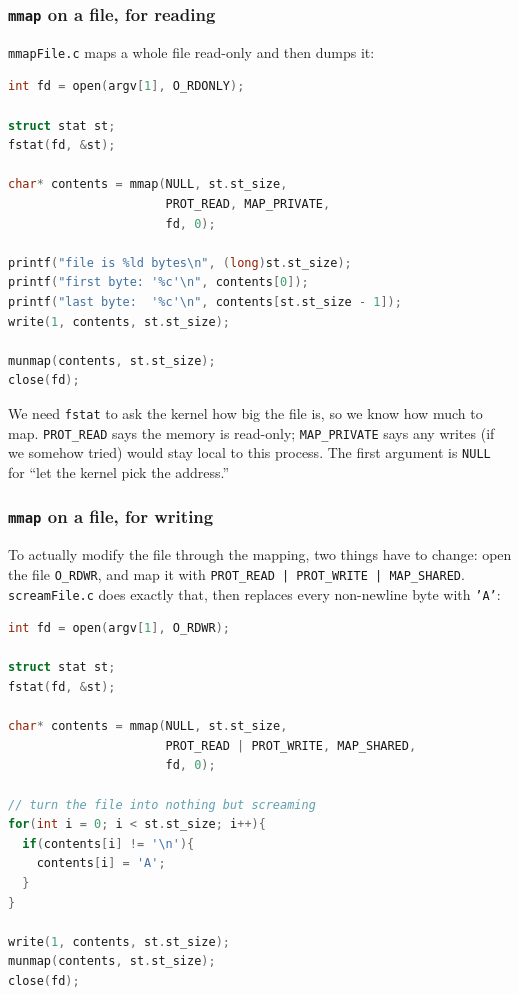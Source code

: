 \documentclass[11pt]{article}
\begin{document}
\subsubsection*{\texttt{mmap} on a file, for reading}

\texttt{mmapFile.c} maps a whole file read-only and then dumps it:

\begin{lstlisting}[language=C]
int fd = open(argv[1], O_RDONLY);

struct stat st;
fstat(fd, &st);

char* contents = mmap(NULL, st.st_size,
                      PROT_READ, MAP_PRIVATE,
                      fd, 0);

printf("file is %ld bytes\n", (long)st.st_size);
printf("first byte: '%c'\n", contents[0]);
printf("last byte:  '%c'\n", contents[st.st_size - 1]);
write(1, contents, st.st_size);

munmap(contents, st.st_size);
close(fd);
\end{lstlisting}

We need \texttt{fstat} to ask the kernel how big the file is, so we
know how much to map. \texttt{PROT\_READ} says the memory is
read-only; \texttt{MAP\_PRIVATE} says any writes (if we somehow
tried) would stay local to this process. The first argument is
\texttt{NULL} for ``let the kernel pick the address.''

\subsubsection*{\texttt{mmap} on a file, for writing}

To actually modify the file through the mapping, two things have to
change: open the file \texttt{O\_RDWR}, and map it with
\texttt{PROT\_READ | PROT\_WRITE | MAP\_SHARED}.
\texttt{screamFile.c} does exactly that, then replaces every
non-newline byte with \texttt{'A'}:

\begin{lstlisting}[language=C]
int fd = open(argv[1], O_RDWR);

struct stat st;
fstat(fd, &st);

char* contents = mmap(NULL, st.st_size,
                      PROT_READ | PROT_WRITE, MAP_SHARED,
                      fd, 0);

// turn the file into nothing but screaming
for(int i = 0; i < st.st_size; i++){
  if(contents[i] != '\n'){
    contents[i] = 'A';
  }
}

write(1, contents, st.st_size);
munmap(contents, st.st_size);
close(fd);
\end{lstlisting}
\end{document}
